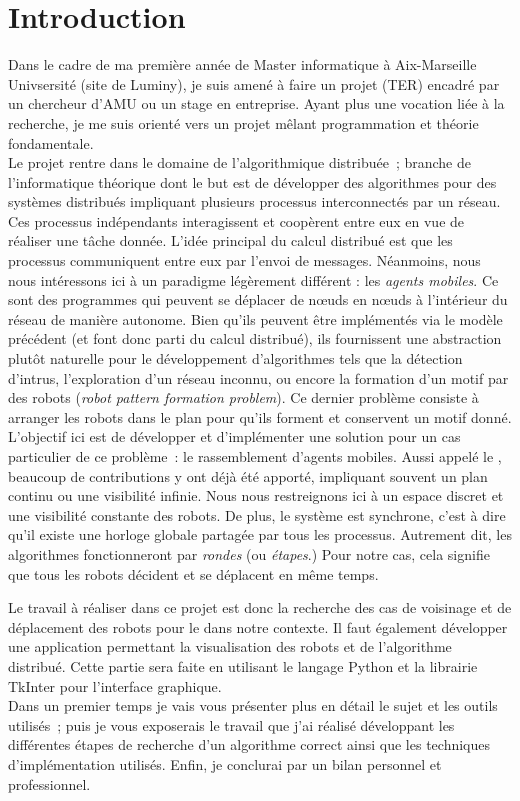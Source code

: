 \section{Introduction}
Dans le cadre de ma première année de Master informatique à Aix-Marseille
Univsersité (site de Luminy), je suis amené à faire un projet (TER) encadré par
un chercheur d'AMU ou un stage en entreprise. Ayant plus une vocation liée à la
recherche, je me suis orienté vers un projet mêlant programmation et théorie
fondamentale. \\

Le projet rentre dans le domaine de l'algorithmique distribuée~; branche de
l'informatique théorique dont le but est de développer des algorithmes pour des
systèmes distribués impliquant plusieurs processus interconnectés par un
réseau. Ces processus indépendants interagissent et coopèrent entre eux en vue
de réaliser une tâche donnée.  L'idée principal du calcul distribué est que les
processus communiquent entre eux par l'envoi de messages. Néanmoins, nous nous
intéressons ici à un paradigme légèrement différent : les \textit{agents
mobiles}. Ce sont des programmes qui peuvent se déplacer de n\oe{}uds en
n\oe{}uds à l'intérieur du réseau de manière autonome. Bien qu'ils peuvent être
implémentés via le modèle précédent (et font donc parti du calcul distribué),
ils fournissent une abstraction plutôt naturelle pour le développement
d'algorithmes tels que la détection d'intrus, l'exploration d'un réseau
inconnu, ou encore la formation d'un motif par des robots (\textit{robot
pattern formation problem}). Ce dernier problème consiste à arranger les robots
dans le plan pour qu'ils forment et conservent un motif donné. \\

L'objectif ici est de développer et d'implémenter une solution pour un cas
particulier de ce problème~: le rassemblement d'agents mobiles. Aussi appelé le
\GatheringProblem, beaucoup de contributions y ont déjà été apporté, impliquant
souvent un plan continu ou une visibilité infinie. Nous nous restreignons ici à
un espace discret et une visibilité constante des robots. De plus, le système
est synchrone, c'est à dire qu'il existe une horloge globale partagée par tous
les processus. Autrement dit, les algorithmes fonctionneront par
\textit{rondes} (ou \textit{étapes}.) Pour notre cas, cela signifie que tous
les robots décident et se déplacent en même temps.

Le travail à réaliser dans ce projet est donc la recherche des cas de voisinage
et de déplacement des robots pour le \GatheringProblem dans notre contexte. Il
faut également développer une application permettant la visualisation des
robots et de l'algorithme distribué. Cette partie sera faite en utilisant le
langage Python et la librairie TkInter pour l'interface graphique. \\

Dans un premier temps je vais vous présenter plus en détail le sujet et les
outils utilisés~; puis je vous exposerais le travail que j'ai réalisé
développant les différentes étapes de recherche d'un algorithme correct ainsi
que les techniques d'implémentation utilisés. Enfin, je conclurai par un bilan
personnel et professionnel.
